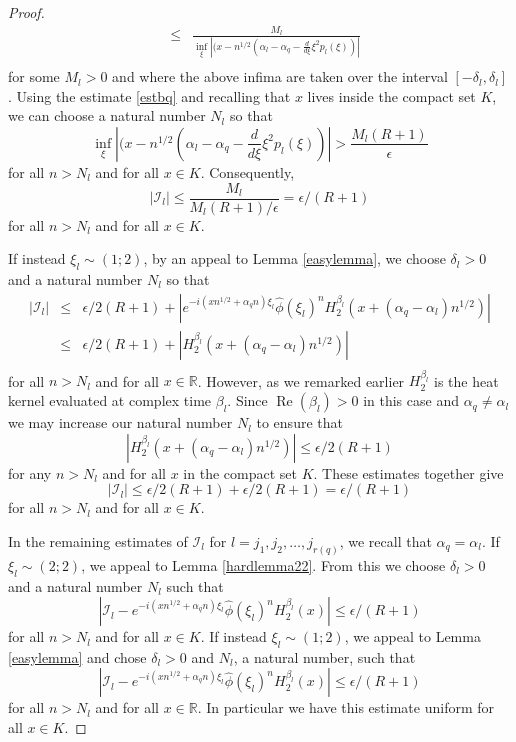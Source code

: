 \documentclass{article}
\theoremstyle{theorem}
\theoremstyle{remark}
\renewcommand\Re{\operatorname{Re}}%
\begin{document}
\begin{proof}
\begin{eqnarray*}
&\leq& \frac{M_l}{\inf_{\xi}|(x-n^{1/2}(\alpha_l-\alpha_q-\frac{d}{d\xi}\xi^2p_l(\xi))|}\\
\end{eqnarray*}
for some $M_l>0$ and where the above infima are taken over the interval $[-\delta_l,\delta_l]$. Using the estimate \eqref{estbq} and recalling that $x$ lives inside the compact set $K$, we can choose a natural number $N_l$ so that
\begin{equation*}
 \inf_{\xi}|(x-n^{1/2}(\alpha_l-\alpha_q-\frac{d}{d\xi}\xi^2p_l(\xi))|>\frac{M_l (R+1)}{\epsilon}
\end{equation*}
for all $n>N_l$ and for all $x\in K$. Consequently, 
\begin{equation}\label{QR122}
 |\mathcal{I}_l|\leq \frac{M_l}{M_l (R+1)/\epsilon}=\epsilon/(R+1)
\end{equation}
for all $n>N_l$ and for all $x\in K$.

If instead $\xi_l\sim(1;2)$, by an appeal to Lemma \ref{easylemma}, we choose $\delta_l>0$ and a natural number $N_l$ so that
\begin{eqnarray*}
|\mathcal{I}_l|&\leq &\epsilon/{2(R+1)}+|e^{-i(xn^{1/2}+\alpha_q
n)\xi_l}\hat\phi(\xi_l)^n H_2^{\beta_l}(x+(\alpha_q-\alpha_l)n^{1/2})|\\
&\leq&\epsilon/{2(R+1)}+|H_2^{\beta_l}(x+(\alpha_q-\alpha_l)n^{1/2})|\\
\end{eqnarray*}
for all $n>N_l$ and for all $x\in \mathbb{R}$. However, as we remarked earlier $H_2^{\beta_l}$ is the heat kernel evaluated at
complex time $\beta_l$. Since $\Re(\beta_l)>0$ in this case and
$\alpha_q\neq\alpha_l$ we may increase our natural number $N_l$ to ensure that 
\begin{equation*}
 |H_2^{\beta_l}(x+(\alpha_q-\alpha_l)n^{1/2})|\leq \epsilon/ {2(R+1)}
\end{equation*}
for any $n>N_l$ and for all $x$ in the compact set $K$. These estimates together give 
\begin{equation}\label{R1R22}
 |\mathcal{I}_l|\leq \epsilon/ {2(R+1)}+\epsilon/ {2(R+1)} =\epsilon/(R+1)
\end{equation}
for all $n>N_l$ and for all $x\in K$.

In the remaining estimates of $\mathcal{I}_l$ for $l=j_1,j_2,\dots,j_{r(q)}$, we recall that $\alpha_q=\alpha_l$. If $\xi_l\sim(2;2)$, we appeal to Lemma \ref{hardlemma22}. From this we choose $\delta_l>0$ and a natural number $N_l$ such that
\begin{equation}\label{1Q122}
|\mathcal{I}_l-e^{-i(xn^{1/2}+\alpha_q
n)\xi_l}\hat{\phi}(\xi_l)^n H_2^{\beta_l}(x)|\leq \epsilon/(R+1)
\end{equation}
for all $n>N_l$ and for all $x\in K$. If instead $\xi_l\sim(1;2)$, we appeal to Lemma \ref{easylemma}
and chose $\delta_l>0$ and $N_l$, a natural number, such that
\begin{equation}\label{QQ122}
|\mathcal{I}_l-e^{-i(xn^{1/2}+\alpha_q
n)\xi_l}\hat{\phi}(\xi_l)^n H_2^{\beta_l}(x)|\leq \epsilon/(R+1)
\end{equation}
for all $n>N_l$ and for all $x\in \mathbb{R}$. In particular we have this estimate uniform for all $x\in K$.


\end{proof}
\end{document}
